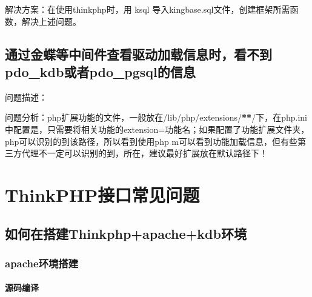 \documentclass[letterpaper,10pt,english]{sphinxmanual}
\begin{document}
\begin{figure}[htbp]
\centering

\noindent{}
\end{figure}

解决方案：在使用thinkphp时，用 ksql 导入kingbase.sql文件，创建框架所需函数，解决上述问题。


\subsection{通过金蝶等中间件查看驱动加载信息时，看不到pdo\_kdb或者pdo\_pgsql的信息}
\label{\detokenize{interface/pdo:pdo-kdbpdo-pgsql}}
问题描述：

\begin{figure}[htbp]
\centering

\noindent{}
\end{figure}

\begin{figure}[htbp]
\centering

\noindent{}
\end{figure}

问题分析：php扩展功能的文件，一般放在/lib/php/extensions/{\color{red}\bfseries{}**}/下，在php.ini中配置是，只需要将相关功能的extension=功能名；如果配置了功能扩展文件夹，php可以识别的到该路径，所以看到使用php \sphinxhyphen{}m可以看到功能加载信息，但有些第三方代理不一定可以识别的到，所在，建议最好扩展放在默认路径下！


\section{ThinkPHP接口常见问题}
\label{\detokenize{interface/thinkPHP:thinkphp}}\label{\detokenize{interface/thinkPHP::doc}}

\subsection{如何在搭建Thinkphp+apache+kdb环境}
\label{\detokenize{interface/thinkPHP:thinkphp-apache-kdb}}

\subsubsection{apache环境搭建}
\label{\detokenize{interface/thinkPHP:apache}}

\paragraph{源码编译}
\label{\detokenize{interface/thinkPHP:id1}}
\begin{sphinxVerbatim}[commandchars=\\\{\}]
\end{sphinxVerbatim}
\end{document}
